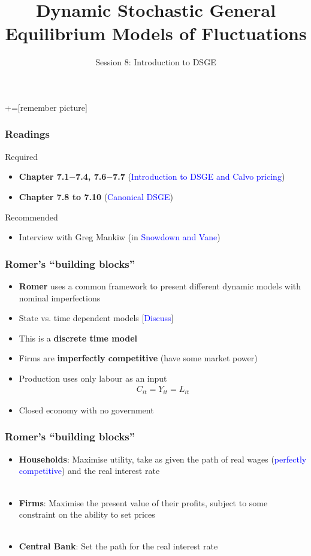 \documentclass[10pt, xcolor=x11names, table]{beamer}
\title[DSGE]{Dynamic Stochastic General Equilibrium Models of Fluctuations}
\subtitle{\large Session 8: Introduction to DSGE}
\institute[]{ECO5021F: Advanced Macroeconomics\\ University of Cape Town}
\author{}
\date{} %
\begin{document}

+=[remember picture]
\everymath{\displaystyle}

\frame{\titlepage}


\begin{frame}
\frametitle{Readings}
Required
\begin{itemize}
\item \textbf{Chapter 7.1$-$7.4, 7.6$-$7.7}  (\textcolor{blue}{Introduction to DSGE and Calvo pricing})
\item \textbf{Chapter 7.8 to 7.10} (\textcolor{blue}{Canonical DSGE})
\end{itemize}
Recommended
\begin{itemize}
\item Interview with Greg Mankiw (in \textcolor{blue}{Snowdown and Vane})
\end{itemize}
\end{frame}



\begin{frame}
\frametitle{Romer's ``building blocks''}
\begin{itemize}
\item \textbf{Romer} uses a common framework to present different dynamic models with nominal imperfections
\item State vs. time dependent models [\textcolor{blue}{Discuss}]
\item This is a \textbf{discrete time model} %
\item Firms are \textbf{imperfectly competitive} (have some market power)
\item Production uses only labour as an input %
\begin{align*}
  C_{it} = Y_{it} = L_{it}
\end{align*}
\item Closed economy with no government
\end{itemize}
\end{frame}

\begin{frame}
\frametitle{Romer's ``building blocks''}
\begin{itemize}
\item \textbf{Households}: Maximise utility, take as given the path of real wages (\textcolor{blue}{perfectly competitive}) and the real interest rate \\~\\
\item \textbf{Firms}: Maximise the present value of their profits, subject to some constraint on the ability to set prices \\~\\
\item \textbf{Central Bank}: Set the path for the real interest rate
\end{itemize}
\end{frame}
\end{document}
